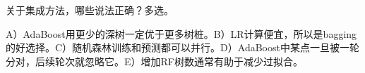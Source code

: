 关于集成方法，哪些说法正确？多选。


A）AdaBoost用更少的深树一定优于更多树桩。B）LR计算便宜，所以是bagging的好选择。C）随机森林训练和预测都可以并行。D）AdaBoost中某点一旦被一轮分对，后续轮次就忽略它。E）增加RF树数通常有助于减少过拟合。
